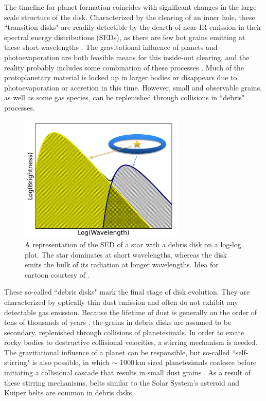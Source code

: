 The timeline for planet formation coincides with significant changes in the large scale structure of the disk. Characterized by the clearing of an inner hole, these ``transition disks" are readily detectible by the dearth of near-IR emission in their spectral energy distributions (SEDs), as there are few hot grains emitting at these short wavelengths \citep{Stro89}. The gravitational influence of planets and photoevaporation are both feasible means for this inside-out clearing, and the reality probably includes some combination of these processes \citep{Wyat14}. Much of the protoplanetary material is locked up in larger bodies or disappears due to photoevaporation or accretion in this time. However, small and observable grains, as well as some gas species, can be replenished through collisions in ``debris" processes. 

\begin{figure}
\centering
\includegraphics[width=0.7\textwidth]{49CET_SED_Cartoon_StarInsideDisk.png}
\caption{A representation of the SED of a star with a debris disk on a log-log plot. The star dominates at short wavelengths, whereas the disk emits the bulk of its radiation at longer wavelengths. Idea for cartoon courtesy of \cite{Stee14}.}
\label{fig:49CET_SED_Cartoon}
\end{figure}

These so-called ``debris disks" mark the final stage of disk evolution. They are characterized by optically thin dust emission and often do not exhibit any detectable gas emission. Because the lifetime of dust is generally on the order of tens of thousands of years \citep{Su13}, the grains in debris disks are assumed to be secondary, replenished through collisions of planetesimals. In order to excite rocky bodies to destructive collisional velocities, a stirring mechanism is needed. The gravitational influence of a planet can be responsible, but so-called ``self-stirring" is also possible, in which $\sim$ 1000\,km sized planetesimals coalesce before initiating a collisional cascade that results in small dust grains \citep{Keny04, Keny08, Must09, Moor13}. As a result of these stirring mechanisms, belts similar to the Solar System's asteroid and Kuiper belts are common in debris disks. 



